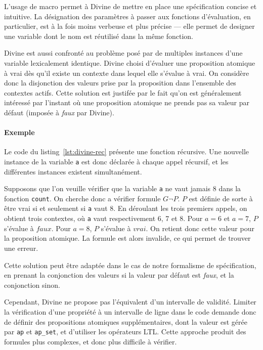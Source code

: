 L'usage de macro permet à Divine de mettre en place une spécification concise et
intuitive. La désignation des paramètres à passer aux fonctions d'évaluation, en
particulier, est à la fois moins verbeuse et plus précise --- elle permet de
designer une variable dont le nom est réutilisé dans la même fonction.

Divine est aussi confronté au problème posé par de multiples instances d'une
variable lexicalement identique. Divine choisi d'évaluer une proposition
atomique à vrai dès qu'il existe un contexte dans lequel elle s'évalue à vrai.
On considère donc la disjonction des valeurs prise par la proposition dans
l'ensemble des contextes actifs. Cette solution est justifée par le fait qu'on
est généralement intéressé par l'instant où une proposition atomique ne prends
pas sa valeur par défaut (imposée à \emph{faux} par Divine).

\paragraph{Exemple}
Le code du listing~\ref{lst:divine-rec} présente une fonction récursive. Une
nouvelle instance de la variable \texttt{a} est donc déclarée à chaque appel
récursif, et les différentes instances existent simultanément.

Supposons que l'on veuille vérifier que la variable \texttt{a} ne vaut jamais 8
dans la fonction \texttt{count}. On cherche donc a vérifier formule \(G \lnot
P\). \(P\) est définie de sorte à être vrai si et seulement si \texttt{a} vaut
8. En déroulant les trois premiers appels, on obtient trois contextes, où
\texttt{a} vaut respectivement 6, 7 et 8. Pour \(a = 6\) et \(a = 7\), \(P\)
s'évalue à \(faux\). Pour \(a = 8\), \(P\) s'évalue à \(vrai\). On retient donc
cette valeur pour la proposition atomique. La formule est alors invalide, ce qui
permet de trouver une erreur.

Cette solution peut être adaptée dans le cas de notre formalisme de
spécification, en prenant la conjonction des valeurs si la valeur par défaut est
\emph{faux}, et la conjonction sinon.

Cependant, Divine ne propose pas l'équivalent d'un intervalle de validité.
Limiter la vérification d'une propriété à un intervalle de ligne dans le code
demande donc de définir des propositions atomiques supplémentaires, dont la
valeur est gérée par \texttt{ap} et \texttt{ap\_set}, et d'utiliser les
opérateurs \ac{LTL}. Cette approche produit des formules plus complexes, et donc
plus difficile à vérifier.
